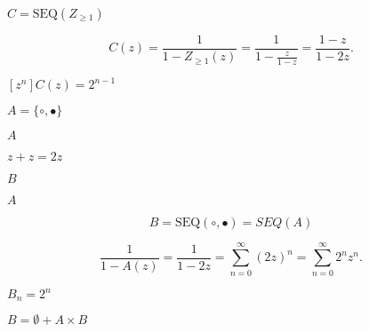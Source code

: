 \documentclass[10pt]{book}
\begin{document}
\begin{mdSnippets}
\begin{mdInlineSnippet}
$C=\text{SEQ}(Z_{\geq1})$\end{mdInlineSnippet}%
\begin{mdDisplaySnippet}[36219a14f7414d3c3884512d6012ec17]%
\[%
 C(z)=\frac{1}{1-Z_{\geq1}(z)}=\frac{1}{1-\frac{z}{1-z}}=\frac{1-z}{1-2z}.
\]%
\end{mdDisplaySnippet}%
\begin{mdInlineSnippet}[4bb8eae0518784707e4f9d6a8d60e295]%
$[z^n]C(z)=2^{n-1}$\end{mdInlineSnippet}%
\begin{mdInlineSnippet}[fca55d2328dc748f13ca41b98911074e]%
$A = \{\circ,\bullet\}$\end{mdInlineSnippet}%
\begin{mdInlineSnippet}[7fc56270e7a70fa81a5935b72eacbe29]%
$A$\end{mdInlineSnippet}%
\begin{mdInlineSnippet}%
$z + z=2z$\end{mdInlineSnippet}%
\begin{mdInlineSnippet}%
$B$\end{mdInlineSnippet}%
\begin{mdInlineSnippet}[7fc56270e7a70fa81a5935b72eacbe29]%
$A$\end{mdInlineSnippet}%
\begin{mdDisplaySnippet}[44f3bee5a5d5fb765263fa2f22550a32]%
\[%
B = \text{SEQ}(\circ,\bullet)=SEQ(A)
\]%
\end{mdDisplaySnippet}%
\begin{mdDisplaySnippet}%
\[%
\frac{1}{1-A(z)}=\frac{1}{1-2z} = \sum_{n=0}^\infty (2z)^n=\sum_{n=0}^\infty 2^nz^n.
\]%
\end{mdDisplaySnippet}%
\begin{mdInlineSnippet}[40e5fb314fd79f999e5c45f397317655]%
$B_n=2^n$\end{mdInlineSnippet}%
\begin{mdInlineSnippet}[2e316beb75845dc29e752d522d1c77c8]%
$B = \emptyset + A \times B$\end{mdInlineSnippet}%
\begin{mdDisplaySnippet}[3359a0ee5a38412f5b8a9a46108a25b2]%

\end{mdDisplaySnippet}
\end{mdSnippets}
\end{document}

